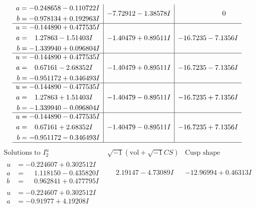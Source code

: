 \documentclass[1p]{elsarticle_modified}
\theoremstyle{definition}
\newcommand{\I}{\sqrt{-1}}
\begin{document}
$$\begin{array}{c|c|c}
\begin{aligned}
a &= -0.248658 - 0.110722 I \\
b &= -0.978134 + 0.192963 I\end{aligned}
 & -7.72912 - 1.38578 I & \phantom{-0.000000 } 0 \\ \hline\begin{aligned}
u &= -0.144890 + 0.477535 I \\
a &= \phantom{-}1.27863 - 1.51403 I \\
b &= -1.339940 + 0.096804 I\end{aligned}
 & -1.40479 + 0.89511 I & -16.7235 - 7.1356 I \\ \hline\begin{aligned}
u &= -0.144890 + 0.477535 I \\
a &= \phantom{-}0.67161 - 2.68352 I \\
b &= -0.951172 + 0.346493 I\end{aligned}
 & -1.40479 + 0.89511 I & -16.7235 - 7.1356 I \\ \hline\begin{aligned}
u &= -0.144890 - 0.477535 I \\
a &= \phantom{-}1.27863 + 1.51403 I \\
b &= -1.339940 - 0.096804 I\end{aligned}
 & -1.40479 - 0.89511 I & -16.7235 + 7.1356 I \\ \hline\begin{aligned}
u &= -0.144890 - 0.477535 I \\
a &= \phantom{-}0.67161 + 2.68352 I \\
b &= -0.951172 - 0.346493 I\end{aligned}
 & -1.40479 - 0.89511 I & -16.7235 + 7.1356 I\\
 \hline 
 \end{array}$$\newpage$$\begin{array}{c|c|c}  
\text{Solutions to }I^u_{2}& \I (\text{vol} + \sqrt{-1}CS) & \text{Cusp shape}\\
 \hline 
\begin{aligned}
u &= -0.224607 + 0.302512 I \\
a &= \phantom{-}1.118150 - 0.435820 I \\
b &= \phantom{-}0.962841 + 0.477795 I\end{aligned}
 & \phantom{-}2.19147 - 4.73089 I & -12.96994 + 0.46313 I \\ \hline\begin{aligned}
u &= -0.224607 + 0.302512 I \\
a &= -0.91977 + 4.19208 I \\

\end{aligned}
\end{array}$$
\end{document}
